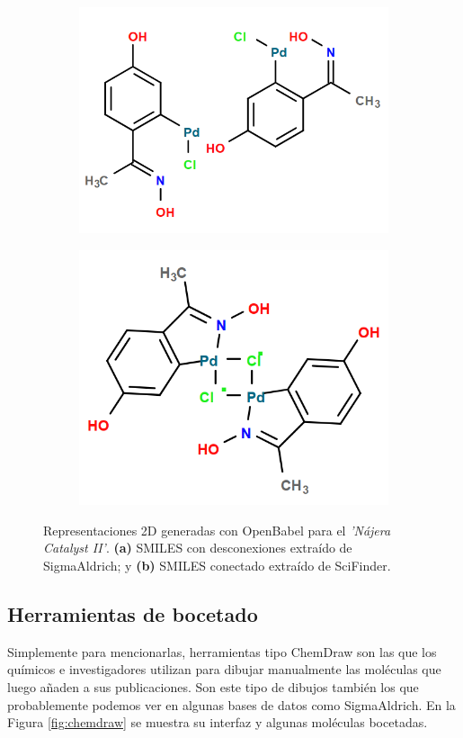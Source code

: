 \begin{figure}[h!]
\centering
\begin{subfigure}{.5\textwidth}
  \centering
  \includegraphics[width=.9\linewidth, frame]{imagenes/estado_arte/dotted_SA.png}
  \caption{}
  \label{fig:sub1}
\end{subfigure}%
\begin{subfigure}{.5\textwidth}
  \centering
  \includegraphics[width=.8\linewidth, frame]{imagenes/estado_arte/not_dotted_SF.png}
  \caption{}
  \label{fig:sub2}
\end{subfigure}
\caption{Representaciones 2D generadas con OpenBabel para el \emph{'Nájera Catalyst II'}. \textbf{(a)} SMILES con desconexiones extraído de SigmaAldrich; y \textbf{(b)} SMILES conectado extraído de SciFinder.}
\label{fig:dotted_smiles_vs_complete}
\end{figure}


\subsection{Herramientas de bocetado}
Simplemente para mencionarlas, herramientas tipo ChemDraw \cite{chemdraw_page} son las que los químicos e investigadores utilizan para dibujar manualmente las moléculas que luego añaden a sus publicaciones. Son este tipo de dibujos también los que probablemente podemos ver en algunas bases de datos como SigmaAldrich. En la Figura \ref{fig:chemdraw} se muestra su interfaz y algunas moléculas bocetadas.

